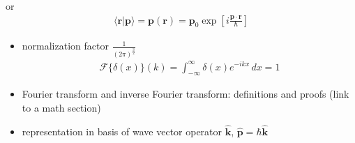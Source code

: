 \documentclass[letterpaper,10pt,english]{jupyterBook}
\begin{document}
\begin{itemize}
\begin{equation*}
\end{equation*}
\sphinxAtStartPar
or
\begin{equation*}
\begin{split}\langle \mathbf{r} | \mathbf{p} \rangle = \mathbf{p}(\mathbf{r}) = \mathbf{p}_0 \exp \left[ i \frac{\mathbf{p} \cdot \mathbf{r}}{\hbar} \right]\end{split}
\end{equation*}
\sphinxAtStartPar
{}
\begin{itemize}
\item {} 
\sphinxAtStartPar
normalization factor \(\frac{1}{(2 \pi)^{\frac{3}{2}}}\)
\begin{equation*}
\begin{split}\mathscr{F}\{ \delta(x) \}(k) = \int_{-\infty}^{\infty} \delta(x) e^{-ikx} \, dx = 1\end{split}
\end{equation*}
\item {} 
\sphinxAtStartPar
Fourier transform and inverse Fourier transform: definitions and proofs (link to a math section)

\item {} 
\sphinxAtStartPar
representation in basis of wave vector operator \(\hat{\mathbf{k}}\), \(\hat{\mathbf{p}} = \hbar \hat{\mathbf{k}}\)

\end{itemize}

\end{itemize}
\end{document}
